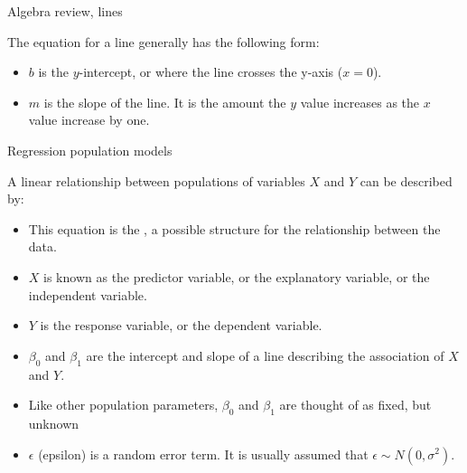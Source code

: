 \documentclass[xcolor=table, aspectratio=169, bigger, handout]{beamer}
\begin{document}
\begin{frame}{Algebra review, lines}
\begin{block}{}
The equation for a line generally has the following form:\\
\smallskip
{}
\begin{itemize}
\item $b$ is the $y$-intercept, or where the line crosses the y-axis ($x=0$).
\item $m$ is the slope of the line. It is the amount the $y$ value increases as the $x$ value increase by one.
\end{itemize}
\end{block}
\end{frame}

\begin{frame}{Regression population models}
\begin{block}{}
A linear relationship between populations of variables $X$ and $Y$ can be described by:\\
\smallskip
{}
\smallskip
\begin{itemize}
\pause\item This equation is the , a possible structure for the relationship between the data.
\pause\item $X$ is known as the predictor variable, or the explanatory variable, or the independent variable.
\pause\item $Y$ is the response variable, or the dependent variable.
\pause\item $\beta_0$ and $\beta_1$ are the intercept and slope of a line describing the association of $X$ and $Y$.
\pause\item Like other population parameters, $\beta_0$ and $\beta_1$ are thought of as fixed, but unknown
\pause\item $\epsilon$ (epsilon) is a random error term. It is usually assumed that $\epsilon \sim N(0, \sigma^2)$.
\end{itemize}
\end{block}
\end{frame}
\end{document}
